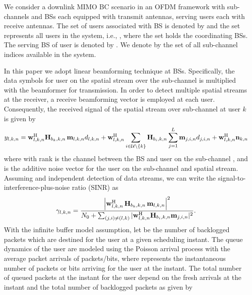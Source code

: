 We consider a downlink \ac{MIMO} \ac{BC} scenario in an \ac{OFDM} framework with  sub-channels and  \acp{BS} each equipped with  transmit antennas, serving  users each with  receive antennas. The set of users associated with \ac{BS}  is denoted by  and the set  represents all users in the system, i.e., , where the set  holds the coordinating \acp{BS}. The serving \ac{BS} of user  is denoted by . We denote by  the set of all sub-channel indices available in the system.

In this paper we adopt linear beamforming technique at \acp{BS}. Specifically, the data symbols  for  user  on the  spatial stream over the sub-channel  is multiplied with the beamformer  for transmission.   In order to detect  multiple spatial streams at the receiver, a receive beamforming vector  is employed at each user. Consequently, the received signal of the  spatial stream over sub-channel  at user $k$ is given by
\begin{equation}\label{eqn-1}
y_{l,k,n} = \mvec{w}{l,k,n}^\herm \mvec{H}{b_k,k,n} \,\mvec{m}{l,k,n} d_{l,k,n} + \mvec{w}{l,k,n}^\herm \sum_{i \in \mc{U} \backslash \set{k}} \mvec{H}{b_i,k,n} \sum_{j = 1}^L \mvec{m}{j,i,n}d_{j,i,n} + \mvec{w}{l,k,n}^\herm \mvec{n}{k,n}
\end{equation}
where  with rank  is the channel between the \ac{BS}  and  user  on the sub-channel , and   is the additive noise vector for the user  on the  sub-channel and  spatial stream. Assuming   and independent detection of data streams, we can write the signal-to-interference-plus-noise ratio (SINR) as
\begin{equation}\label{eq:SINR}
\gamma_{l,k,n} = \dfrac{\left |\mvec{w}{l,k,n}^\herm \, \mvec{H}{b_k,k,n} \, \mvec{m}{l,k,n} \right |^2}{N_0 + \sum_{(j,i) \neq (l,k)} |\mvec{w}{l,k,n}^\herm \mvec{H}{b_i,k,n} \mvec{m}{j,i,n} |^2}.
\end{equation}
With the infinite buffer model assumption, let  be the number of backlogged packets which are destined for the user  at a given scheduling instant. The queue dynamics of the user  are modeled using the Poisson arrival process with the average packet arrivals of  packets/bits, where  represents the instantaneous number of packets or bits arriving for the user  at the  instant. The total number of queued packets at the  instant for the user  depend on the fresh arrivals at the  instant and the total number of backlogged packets  as given by
